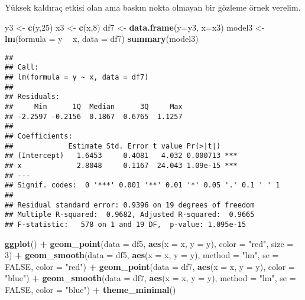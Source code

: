 \documentclass[
]{book}
\newenvironment{Shaded}{\begin{snugshade}}{\end{snugshade}}
\newcommand{\DataTypeTok}[1]{\textcolor[rgb]{0.13,0.29,0.53}{#1}}
\newcommand{\DecValTok}[1]{\textcolor[rgb]{0.00,0.00,0.81}{#1}}
\newcommand{\KeywordTok}[1]{\textcolor[rgb]{0.13,0.29,0.53}{\textbf{#1}}}
\newcommand{\NormalTok}[1]{#1}
\newcommand{\OperatorTok}[1]{\textcolor[rgb]{0.81,0.36,0.00}{\textbf{#1}}}
\newcommand{\OtherTok}[1]{\textcolor[rgb]{0.56,0.35,0.01}{#1}}
\newcommand{\StringTok}[1]{\textcolor[rgb]{0.31,0.60,0.02}{#1}}
\begin{document}
Yüksek kaldıraç etkisi olan ama baskın nokta olmayan bir gözleme örnek verelim.

\begin{Shaded}
\begin{Highlighting}[]
\NormalTok{y3 <-}\StringTok{ }\KeywordTok{c}\NormalTok{(y,}\DecValTok{25}\NormalTok{)}
\NormalTok{x3 <-}\StringTok{ }\KeywordTok{c}\NormalTok{(x,}\DecValTok{8}\NormalTok{)}
\NormalTok{df7 <-}\StringTok{ }\KeywordTok{data.frame}\NormalTok{(}\DataTypeTok{y=}\NormalTok{y3, }\DataTypeTok{x=}\NormalTok{x3)}
\NormalTok{model3 <-}\StringTok{ }\KeywordTok{lm}\NormalTok{(}\DataTypeTok{formula =}\NormalTok{ y }\OperatorTok{~}\StringTok{ }\NormalTok{x, }\DataTypeTok{data =}\NormalTok{ df7)}
\KeywordTok{summary}\NormalTok{(model3)}
\end{Highlighting}
\end{Shaded}

\begin{verbatim}
## 
## Call:
## lm(formula = y ~ x, data = df7)
## 
## Residuals:
##     Min      1Q  Median      3Q     Max 
## -2.2597 -0.2156  0.1867  0.6765  1.1257 
## 
## Coefficients:
##             Estimate Std. Error t value Pr(>|t|)    
## (Intercept)   1.6453     0.4081   4.032 0.000713 ***
## x             2.8048     0.1167  24.043 1.09e-15 ***
## ---
## Signif. codes:  0 '***' 0.001 '**' 0.01 '*' 0.05 '.' 0.1 ' ' 1
## 
## Residual standard error: 0.9396 on 19 degrees of freedom
## Multiple R-squared:  0.9682, Adjusted R-squared:  0.9665 
## F-statistic:   578 on 1 and 19 DF,  p-value: 1.095e-15
\end{verbatim}

\begin{Shaded}
\begin{Highlighting}[]
\KeywordTok{ggplot}\NormalTok{() }\OperatorTok{+}
\StringTok{  }\KeywordTok{geom_point}\NormalTok{(}\DataTypeTok{data =}\NormalTok{ df5, }\KeywordTok{aes}\NormalTok{(}\DataTypeTok{x =}\NormalTok{ x, }\DataTypeTok{y =}\NormalTok{ y), }\DataTypeTok{color =} \StringTok{"red"}\NormalTok{, }\DataTypeTok{size =} \DecValTok{3}\NormalTok{) }\OperatorTok{+}
\StringTok{  }\KeywordTok{geom_smooth}\NormalTok{(}\DataTypeTok{data =}\NormalTok{ df5, }\KeywordTok{aes}\NormalTok{(}\DataTypeTok{x =}\NormalTok{ x, }\DataTypeTok{y =}\NormalTok{ y), }\DataTypeTok{method =} \StringTok{"lm"}\NormalTok{, }\DataTypeTok{se =} \OtherTok{FALSE}\NormalTok{, }\DataTypeTok{color =} \StringTok{"red"}\NormalTok{) }\OperatorTok{+}
\StringTok{  }\KeywordTok{geom_point}\NormalTok{(}\DataTypeTok{data =}\NormalTok{ df7, }\KeywordTok{aes}\NormalTok{(}\DataTypeTok{x =}\NormalTok{ x, }\DataTypeTok{y =}\NormalTok{ y), }\DataTypeTok{color =} \StringTok{"blue"}\NormalTok{) }\OperatorTok{+}
\StringTok{  }\KeywordTok{geom_smooth}\NormalTok{(}\DataTypeTok{data =}\NormalTok{ df7, }\KeywordTok{aes}\NormalTok{(}\DataTypeTok{x =}\NormalTok{ x, }\DataTypeTok{y =}\NormalTok{ y), }\DataTypeTok{method =} \StringTok{"lm"}\NormalTok{, }\DataTypeTok{se =} \OtherTok{FALSE}\NormalTok{, }\DataTypeTok{color =} \StringTok{"blue"}\NormalTok{) }\OperatorTok{+}
\StringTok{  }\KeywordTok{theme_minimal}\NormalTok{()}
\end{Highlighting}
\end{Shaded}
\end{document}
